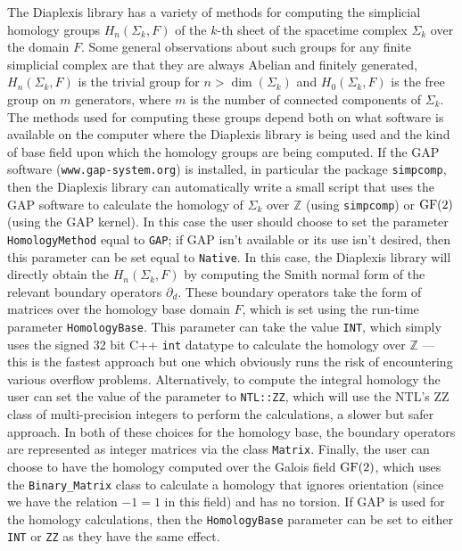 \documentclass[12pt,letterpaper]{report}
\begin{document}
The Diaplexis library has a variety of methods for computing the simplicial homology groups $H_n(\Sigma_k,F)$ 
of the $k$-th sheet of the spacetime complex $\Sigma_k$ over the domain $F$. Some general observations about 
such groups for any finite simplicial complex are that they are always Abelian and finitely generated, 
$H_n(\Sigma_k,F)$ is the trivial group for $n > \dim(\Sigma_k)$ and $H_0(\Sigma_k,F)$ is the free group 
on $m$ generators, where $m$ is the number of connected components of $\Sigma_k$. The methods used for 
computing these groups depend both on what software is available on the computer where the Diaplexis library 
is being used and the kind of base field upon which the homology groups are being computed. If the GAP software 
(\texttt{www.gap-system.org}) is installed, in particular the package \texttt{simpcomp}, then the Diaplexis 
library can automatically write a small script that uses the GAP software to calculate the homology of 
$\Sigma_k$ over $\mathbb{Z}$ (using \texttt{simpcomp}) or $\textnormal{GF}(2)$ (using the GAP kernel). In 
this case the user should choose to set the parameter \texttt{HomologyMethod} equal to \texttt{GAP}; if GAP 
isn't available or its use isn't desired, then this parameter can be set equal to \texttt{Native}. In this 
case, the Diaplexis library will directly obtain the $H_n(\Sigma_k,F)$ by computing the Smith normal form of 
the relevant boundary operators $\partial_d$. These boundary operators take the form of matrices over the 
homology base domain $F$, which is set using the run-time parameter \texttt{HomologyBase}. This parameter 
can take the value \texttt{INT}, which simply uses the signed 32 bit C++ \texttt{int} datatype to calculate 
the homology over $\mathbb{Z}$ --- this is the fastest approach but one which obviously runs the risk of 
encountering various overflow problems. Alternatively, to compute the integral homology the user can set 
the value of the parameter to \texttt{NTL::ZZ}, which will use the NTL's ZZ class of multi-precision integers 
to perform the calculations, a slower but safer approach. In both of these choices for the homology base, 
the boundary operators are represented as integer matrices via the class \texttt{Matrix}. Finally, the 
user can choose to have the homology computed over the Galois field $\textnormal{GF}(2)$, which uses 
the \texttt{Binary\_Matrix} class to calculate a homology that ignores orientation (since we have the 
relation $-1 =1$ in this field) and has no torsion. If GAP is used for the homology calculations, then 
the \texttt{HomologyBase} parameter can be set to either \texttt{INT} or \texttt{ZZ} as they have the 
same effect.  
\end{document}
